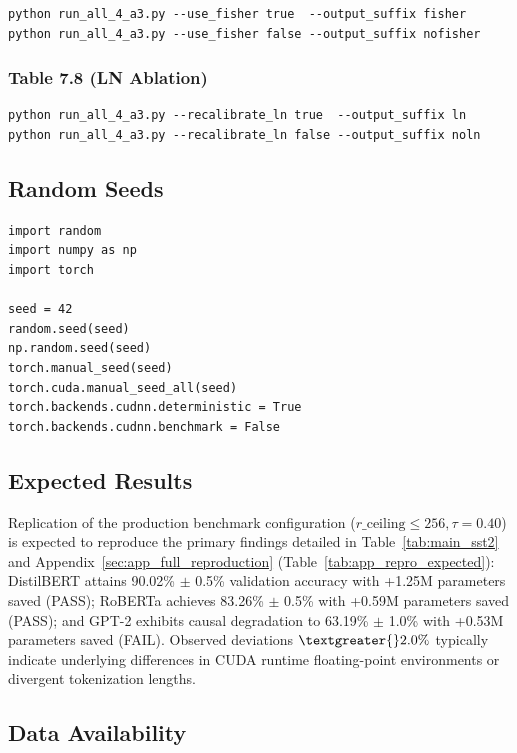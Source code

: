 \begin{lstlisting}
python run_all_4_a3.py --use_fisher true  --output_suffix fisher
python run_all_4_a3.py --use_fisher false --output_suffix nofisher
\end{lstlisting}

\subsubsection{Table 7.8 (LN Ablation)}

\begin{lstlisting}
python run_all_4_a3.py --recalibrate_ln true  --output_suffix ln
python run_all_4_a3.py --recalibrate_ln false --output_suffix noln
\end{lstlisting}

\subsection{Random Seeds}

\begin{lstlisting}
import random
import numpy as np
import torch

seed = 42
random.seed(seed)
np.random.seed(seed)
torch.manual_seed(seed)
torch.cuda.manual_seed_all(seed)
torch.backends.cudnn.deterministic = True
torch.backends.cudnn.benchmark = False
\end{lstlisting}

\subsection{Expected Results}

Replication of the production benchmark configuration ($r\_{\mathrm{ceiling}} \le 256, \tau=0.40$) is expected to reproduce the primary findings detailed in Table~\ref{tab:main_sst2} and Appendix~\ref{sec:app_full_reproduction} (Table~\ref{tab:app_repro_expected}): DistilBERT attains 90.02\% $\pm$ 0.5\% validation accuracy with +1.25M parameters saved (PASS); RoBERTa achieves 83.26\% $\pm$ 0.5\% with +0.59M parameters saved (PASS); and GPT-2 exhibits causal degradation to 63.19\% $\pm$ 1.0\% with +0.53M parameters saved (FAIL). Observed deviations $\textgreater{}2.0\%$ typically indicate underlying differences in CUDA runtime floating-point environments or divergent tokenization lengths.

\subsection{Data Availability}

